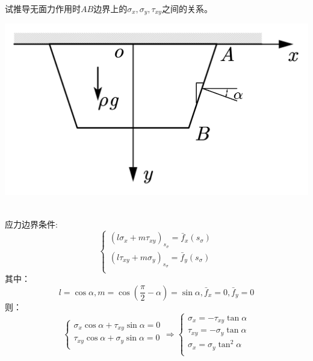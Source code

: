 \begin{example}
	试推导无面力作用时$AB$边界上的$\sigma _x,\sigma _y,\tau _{xy}$之间的关系。
\end{example}
\centerline{\includegraphics[scale=0.5]{figure/2-17.png}}
	\begin{remark}
		\quad\\
		应力边界条件:\[\begin{cases}
		\left( l\sigma _x+m\tau _{xy} \right) _{s_{\sigma}}=\bar{f}_x\left( s_{\sigma} \right)\\
		\left( l\tau _{xy}+m\sigma _y \right) _{s_{\sigma}}=\bar{f}_y\left( s_{\sigma} \right)\\
		\end{cases}\]
		其中：\[l=\cos \alpha ,m=\cos \left( \frac{\pi}{2}-\alpha \right) =\sin \alpha ,\bar{f}_x=0,\bar{f}_y=0\]
		则：\[\begin{cases}
		\sigma _x\cos \alpha +\tau _{xy}\sin \alpha =0\\
		\tau _{xy}\cos \alpha +\sigma _y\sin \alpha =0\\
		\end{cases}\Longrightarrow \begin{cases}
		\sigma _x=-\tau _{xy}\tan \alpha\\
		\tau _{xy}=-\sigma _y\tan \alpha\\
		\sigma _x=\sigma _y\tan ^2\alpha\\
		\end{cases}\]
	\end{remark}
	
